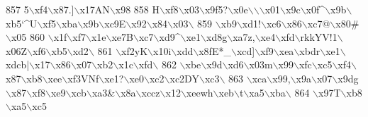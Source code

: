 \begin{DoxyCode}
{{{857 \textcolor{stringliteral}{5\(\backslash\)xf4\(\backslash\)x87.]\(\backslash\)x17AN\(\backslash\)x98%
858 \textcolor{stringliteral}{H\(\backslash\)xf8\(\backslash\)x03\(\backslash\)x9f5?\(\backslash\)x0e\(\backslash\)\(\backslash\)\(\backslash\)x01\(\backslash\)x9c\(\backslash\)x0f^\(\backslash\)x9b\(\backslash\)xb5`^U\(\backslash\)xf5\(\backslash\)xba\(\backslash\)x9b\(\backslash\)xc9E\(\backslash\)x92\(\backslash\)x84\(\backslash\)x03\(\backslash\)}
859 \textcolor{stringliteral}{\(\backslash\)xb9\(\backslash\)xd1!\(\backslash\)xc6\(\backslash\)x86\(\backslash\)xc7@\(\backslash\)x80#\(\backslash\)x05%
860 \textcolor{stringliteral}{\(\backslash\)x1f\(\backslash\)xf7\(\backslash\)x1e\(\backslash\)xe7B\(\backslash\)xc7\(\backslash\)xd9^\(\backslash\)xe1\(\backslash\)xd8g\(\backslash\)xa7z,\(\backslash\)xe4\(\backslash\)xfd\(\backslash\)rkkYV!1\(\backslash\)x06Z\(\backslash\)xf6\(\backslash\)xb5\(\backslash\)xd2\(\backslash\)}
861 \textcolor{stringliteral}{\(\backslash\)xf2yK\(\backslash\)x10i\(\backslash\)xdd\(\backslash\)x8fE*\_\(\backslash\)xcd]\(\backslash\)xf9\(\backslash\)xea\(\backslash\)xbdr\(\backslash\)xe1\(\backslash\)xdcb|\(\backslash\)x17\(\backslash\)x86\(\backslash\)x07\(\backslash\)xb2\(\backslash\)x1c\(\backslash\)xfd\(\backslash\)}
862 \textcolor{stringliteral}{\(\backslash\)xbe\(\backslash\)x9d\(\backslash\)xd6\(\backslash\)x03m\(\backslash\)x99\(\backslash\)xfc\(\backslash\)xc5\(\backslash\)xf4\(\backslash\)x87\(\backslash\)xb8\(\backslash\)xee\(\backslash\)xf3VNf\(\backslash\)xe1?\(\backslash\)xe0\(\backslash\)xc2\(\backslash\)xc2DY\(\backslash\)xc3\(\backslash\)}
863 \textcolor{stringliteral}{\(\backslash\)xca\(\backslash\)x99,\(\backslash\)x9a\(\backslash\)x07\(\backslash\)x9dg\(\backslash\)x87\(\backslash\)xf8\(\backslash\)xe9\(\backslash\)xcb\(\backslash\)xa3&\(\backslash\)x8a\(\backslash\)xccz\(\backslash\)x12\(\backslash\)xeewh\(\backslash\)xeb\(\backslash\)t\(\backslash\)xa5\(\backslash\)xba\(\backslash\)}
864 \textcolor{stringliteral}{\(\backslash\)x97T\(\backslash\)xb8\(\backslash\)xa5\(\backslash\)xc5%
}}}}}}
\end{DoxyCode}
